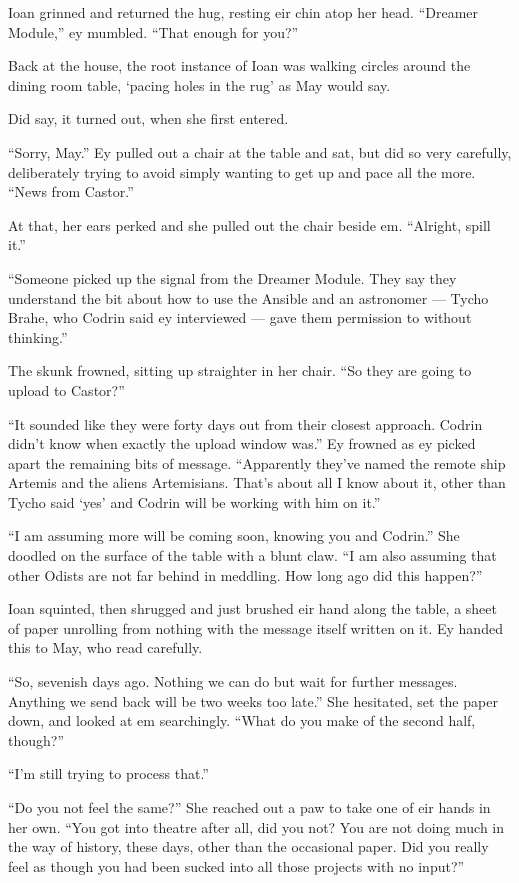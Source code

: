 Ioan grinned and returned the hug, resting eir chin atop her head. ``Dreamer Module,'' ey mumbled. ``That enough for you?''

Back at the house, the root instance of Ioan was walking circles around the dining room table, `pacing holes in the rug' as May would say.

Did say, it turned out, when she first entered.

``Sorry, May.'' Ey pulled out a chair at the table and sat, but did so very carefully, deliberately trying to avoid simply wanting to get up and pace all the more. ``News from Castor.''

At that, her ears perked and she pulled out the chair beside em. ``Alright, spill it.''

``Someone picked up the signal from the Dreamer Module. They say they understand the bit about how to use the Ansible and an astronomer — Tycho Brahe, who Codrin said ey interviewed — gave them permission to without thinking.''

The skunk frowned, sitting up straighter in her chair. ``So they are going to upload to Castor?''

``It sounded like they were forty days out from their closest approach. Codrin didn't know when exactly the upload window was.'' Ey frowned as ey picked apart the remaining bits of message. ``Apparently they've named the remote ship Artemis and the aliens Artemisians. That's about all I know about it, other than Tycho said `yes' and Codrin will be working with him on it.''

``I am assuming more will be coming soon, knowing you and Codrin.'' She doodled on the surface of the table with a blunt claw. ``I am also assuming that other Odists are not far behind in meddling. How long ago did this happen?''

Ioan squinted, then shrugged and just brushed eir hand along the table, a sheet of paper unrolling from nothing with the message itself written on it. Ey handed this to May, who read carefully.

``So, sevenish days ago. Nothing we can do but wait for further messages. Anything we send back will be two weeks too late.'' She hesitated, set the paper down, and looked at em searchingly. ``What do you make of the second half, though?''

``I'm still trying to process that.''

``Do you not feel the same?'' She reached out a paw to take one of eir hands in her own. ``You got into theatre after all, did you not? You are not doing much in the way of history, these days, other than the occasional paper. Did you really feel as though you had been sucked into all those projects with no input?''

